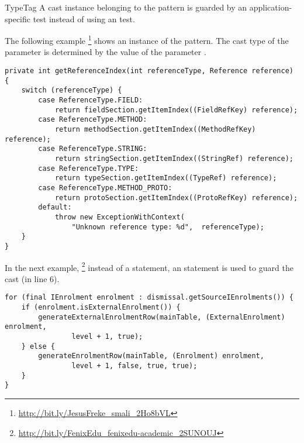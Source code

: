 \begin{pattern}{TypeTag}
%
%
A cast instance belonging to the \thisp{} pattern is guarded by an application-specific test instead of using an  test.

\instances{}
The following example%
\footnote{\url{http://bit.ly/JesusFreke_smali_2Ho8bVL}}
shows an instance of the \thisp{} pattern.
The cast type of the parameter  is determined by the value of the parameter .

\begin{verbatim}
private int getReferenceIndex(int referenceType, Reference reference) {
    switch (referenceType) {
        case ReferenceType.FIELD:
            return fieldSection.getItemIndex((FieldRefKey) reference);
        case ReferenceType.METHOD:
            return methodSection.getItemIndex((MethodRefKey) reference);
        case ReferenceType.STRING:
            return stringSection.getItemIndex((StringRef) reference);
        case ReferenceType.TYPE:
            return typeSection.getItemIndex((TypeRef) reference);
        case ReferenceType.METHOD_PROTO:
            return protoSection.getItemIndex((ProtoRefKey) reference);
        default:
            throw new ExceptionWithContext(
                "Unknown reference type: %d",  referenceType);
    }
}
\end{verbatim}

In the next example,%
\footnote{\url{http://bit.ly/FenixEdu_fenixedu-academic_2SUNOUJ}}
instead of a  statement,
an  statement is used to guard the cast (in line 6).

\begin{verbatim}
for (final IEnrolment enrolment : dismissal.getSourceIEnrolments()) {
    if (enrolment.isExternalEnrolment()) {
        generateExternalEnrolmentRow(mainTable, (ExternalEnrolment) enrolment,
                level + 1, true);
    } else {
        generateEnrolmentRow(mainTable, (Enrolment) enrolment,
                level + 1, false, true, true);
    }
}
\end{verbatim}


\end{pattern}

